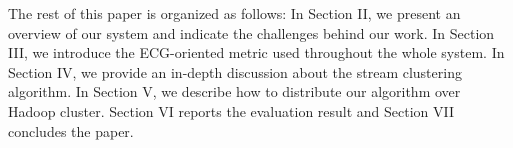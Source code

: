 \documentclass[conference]{IEEEtran}
\begin{document}
The rest of this paper is organized as follows: In Section II, we present an overview of our system and indicate the challenges behind our work. In Section III, we introduce the ECG-oriented metric used throughout the whole system. In Section IV, we provide an in-depth discussion about the stream clustering algorithm. In Section V, we describe how to distribute our algorithm over Hadoop cluster. Section VI reports the evaluation result and Section VII concludes the paper.

%
%



%
%
\end{document}
